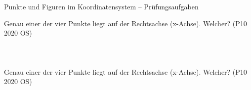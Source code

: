 \setcounter{aufgabe}{11}

\begin{aufgabe}{Punkte und Figuren im Koordinatensystem – Prüfungsaufgaben}
\begin{teile}
\teil Genau einer der vier Punkte liegt auf der Rechtsachse (x-Achse). Welcher? \hfill (P10 2020 OS) \\  \\  \\  \\ 
\teil Genau einer der vier Punkte liegt auf der Rechtsachse (x-Achse). Welcher? \hfill (P10 2020 OS) \\  \\  \\  \\ 
\end{teile}
\end{aufgabe}

